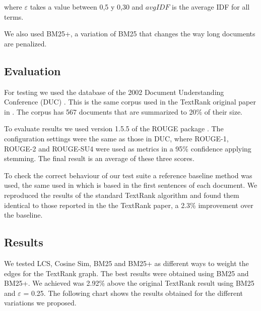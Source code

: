 \documentclass{llncs}
\begin{document}
where $\varepsilon$ takes a value between 0,5 y 0,30 and $avgIDF$ is the average IDF for all terms.

We also used BM25+, a variation of BM25 that changes the way long documents are penalized.


\subsection{Evaluation}
For testing we used the database of the 2002 Document Understanding Conference (DUC) \cite{duc2002-guidelines}. This is the same corpus used in the TextRank original paper in \cite{mihalcea-tarau}. The corpus has 567 documents that are summarized to 20\% of their size.

To evaluate results we used version 1.5.5 of the ROUGE package \cite{Lin2004a}. The configuration settings were the same as those in DUC, where ROUGE-1, ROUGE-2 and ROUGE-SU4 were used as metrics in a 95\% confidence applying stemming. The final result is an average of these three scores.

To check the correct behaviour of our test suite a reference baseline method was used, the same used in \cite{mihalcea-tarau} which is based in the first sentences of each document. We reproduced the results of the standard TextRank algorithm and found them identical to those reported in the the TextRank paper, a 2.3\% improvement over the baseline.


\subsection{Results}
We tested LCS, Cosine Sim, BM25 and BM25+ as different ways to weight the edges for the TextRank graph. 
The best results were obtained using BM25 and BM25+. We achieved was 2.92\% above the original TextRank result using BM25 and $\varepsilon$ = 0.25. The following chart shows the results obtained for the different variations we proposed.
\end{document}
